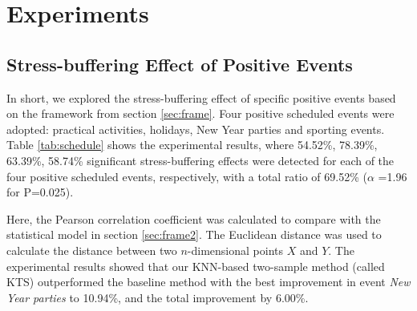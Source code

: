 \section{Experiments}
\subsection{Stress-buffering Effect of Positive Events}
\label{subsec:experiment}
In short,
we explored the stress-buffering effect of specific positive events based on the framework from section \ref{sec:frame}.
Four positive scheduled events were adopted:
practical activities, holidays, New Year parties and sporting events.
Table \ref{tab:schedule} shows the experimental results,
where 54.52\%, 78.39\%, 63.39\%, 58.74\% significant stress-buffering effects were detected for
each of the four positive scheduled events, respectively,
with a total ratio of 69.52\% ($\alpha$ =1.96 for P=0.025).
\begin{table}
\begin{center}
\caption{\small{Quantification of the stress-buffering effect of positive scheduled events applying
the KTS model (the KNN-based two-sample method adopted in this research) and the baseline method.}}
\label{tab:schedule}
\end{center}
\end{table}
Here, the Pearson correlation coefficient was calculated to compare with the statistical model in section \ref{sec:frame2}.
The Euclidean distance was used to calculate the distance between two $n$-dimensional points $X$ and $Y$.
The experimental results showed that our KNN-based two-sample method (called KTS)
outperformed the baseline method with the best improvement in event \emph{New Year parties} to 10.94\%,
and the total improvement by 6.00\%. 


